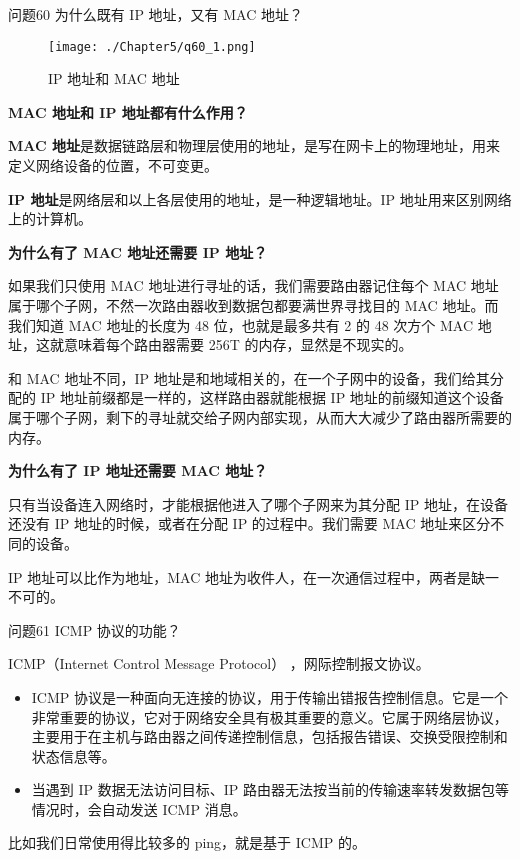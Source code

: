 \documentclass[cn,11pt,color=blue,lang=cn]{elegantbook}
\begin{document}
\begin{custom}{问题60}
为什么既有 IP 地址，又有 MAC 地址？
\end{custom}
\begin{solution}

\begin{figure}[!h]
\centering
\texttt{[image: ./Chapter5/q60\_1.png]}
\caption{IP 地址和 MAC 地址}
\label{fig60_1}
\end{figure}

\begin{note} \textbf{MAC 地址和 IP 地址都有什么作用？} \end{note}
\textbf{MAC 地址}是数据链路层和物理层使用的地址，是写在网卡上的物理地址，用来定义网络设备的位置，不可变更。

\textbf{IP 地址}是网络层和以上各层使用的地址，是一种逻辑地址。IP 地址用来区别网络上的计算机。

\begin{note} \textbf{为什么有了 MAC 地址还需要 IP 地址？} \end{note}
如果我们只使用 MAC 地址进行寻址的话，我们需要路由器记住每个 MAC 地址属于哪个子网，不然一次路由器收到数据包都要满世界寻找目的 MAC 地址。而我们知道 MAC 地址的长度为 48 位，也就是最多共有 2 的 48 次方个 MAC 地址，这就意味着每个路由器需要 256T 的内存，显然是不现实的。

和 MAC 地址不同，IP 地址是和地域相关的，在一个子网中的设备，我们给其分配的 IP 地址前缀都是一样的，这样路由器就能根据 IP 地址的前缀知道这个设备属于哪个子网，剩下的寻址就交给子网内部实现，从而大大减少了路由器所需要的内存。

\begin{note} \textbf{为什么有了 IP 地址还需要 MAC 地址？} \end{note}
只有当设备连入网络时，才能根据他进入了哪个子网来为其分配 IP 地址，在设备还没有 IP 地址的时候，或者在分配 IP 的过程中。我们需要 MAC 地址来区分不同的设备。

IP 地址可以比作为地址，MAC 地址为收件人，在一次通信过程中，两者是缺一不可的。
\end{solution}

\begin{custom}{问题61}
ICMP 协议的功能？
\end{custom}
\begin{solution}
ICMP（Internet Control Message Protocol） ，网际控制报文协议。
\begin{itemize}
	\item ICMP 协议是一种面向无连接的协议，用于传输出错报告控制信息。它是一个非常重要的协议，它对于网络安全具有极其重要的意义。它属于网络层协议，主要用于在主机与路由器之间传递控制信息，包括报告错误、交换受限控制和状态信息等。
	\item 当遇到 IP 数据无法访问目标、IP 路由器无法按当前的传输速率转发数据包等情况时，会自动发送 ICMP 消息。
\end{itemize}

比如我们日常使用得比较多的 ping，就是基于 ICMP 的。

\end{solution}
\end{document}
